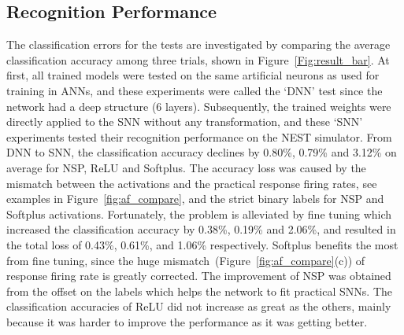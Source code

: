 \documentclass{article}
\begin{document}
	\subsection{Recognition Performance}
	\label{subsec:result_compare}
	The classification errors for the tests are investigated by comparing the average classification accuracy among three trials, shown in Figure~\ref{Fig:result_bar}.
	At first, all trained models were tested on the same artificial neurons as used for training in ANNs, and these experiments were called the `DNN' test since the network had a deep structure (6 layers).
	Subsequently, the trained weights were directly applied to the SNN without any transformation, and these `SNN' experiments tested their recognition performance on the NEST simulator.
	From DNN to SNN, the classification accuracy declines by 0.80\%, 0.79\% and 3.12\% on average for NSP, ReLU and Softplus.
	The accuracy loss was caused by the mismatch between the activations and the practical response firing rates, see examples in Figure~\ref{fig:af_compare}, and the strict binary labels for NSP and Softplus activations.
	Fortunately, the problem is alleviated by fine tuning which increased the classification accuracy by 0.38\%, 0.19\% and 2.06\%, and resulted in the total loss of 0.43\%, 0.61\%, and 1.06\% respectively.
	Softplus benefits the most from fine tuning, since the huge mismatch~(Figure~\ref{fig:af_compare}(c)) of response firing rate is greatly corrected.
	The improvement of NSP was obtained from the offset on the labels which helps the network to fit practical SNNs.
	The classification accuracies of ReLU did not increase as great as the others, mainly because it was harder to improve the performance as it was getting better.
	
	
	
\end{document}
